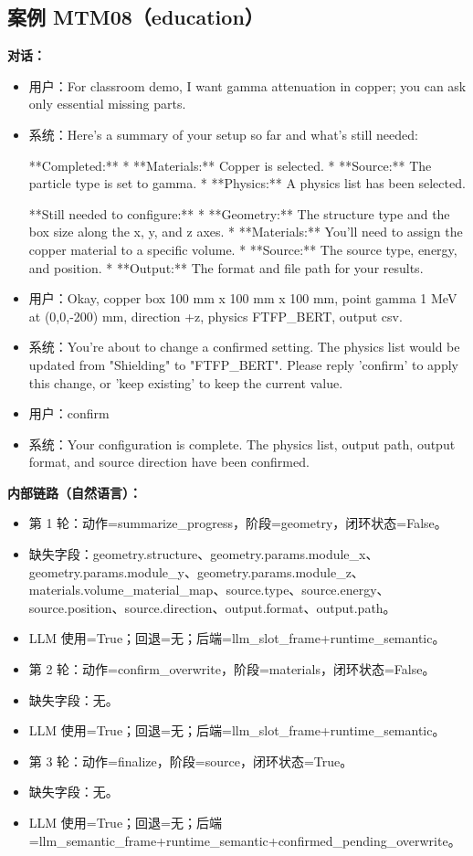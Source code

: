 \documentclass[11pt]{ctexart}
\begin{document}
\subsection{案例 MTM08（education）}
\textbf{对话：}
\begin{itemize}
\item 用户：For classroom demo, I want gamma attenuation in copper; you can ask only essential missing parts.
\item 系统：Here's a summary of your setup so far and what's still needed:

**Completed:**
*   **Materials:** Copper is selected.
*   **Source:** The particle type is set to gamma.
*   **Physics:** A physics list has been selected.

**Still needed to configure:**
*   **Geometry:** The structure type and the box size along the x, y, and z axes.
*   **Materials:** You'll need to assign the copper material to a specific volume.
*   **Source:** The source type, energy, and position.
*   **Output:** The format and file path for your results.
\item 用户：Okay, copper box 100 mm x 100 mm x 100 mm, point gamma 1 MeV at (0,0,-200) mm, direction +z, physics FTFP\_BERT, output csv.
\item 系统：You're about to change a confirmed setting. The physics list would be updated from "Shielding" to "FTFP\_BERT". Please reply 'confirm' to apply this change, or 'keep existing' to keep the current value.
\item 用户：confirm
\item 系统：Your configuration is complete. The physics list, output path, output format, and source direction have been confirmed.
\end{itemize}
\textbf{内部链路（自然语言）：}
\begin{itemize}
\item 第 1 轮：动作=summarize\_progress，阶段=geometry，闭环状态=False。
\item 缺失字段：geometry.structure、geometry.params.module\_x、geometry.params.module\_y、geometry.params.module\_z、materials.volume\_material\_map、source.type、source.energy、source.position、source.direction、output.format、output.path。
\item LLM 使用=True；回退=无；后端=llm\_slot\_frame+runtime\_semantic。
\item 第 2 轮：动作=confirm\_overwrite，阶段=materials，闭环状态=False。
\item 缺失字段：无。
\item LLM 使用=True；回退=无；后端=llm\_slot\_frame+runtime\_semantic。
\item 第 3 轮：动作=finalize，阶段=source，闭环状态=True。
\item 缺失字段：无。
\item LLM 使用=True；回退=无；后端=llm\_semantic\_frame+runtime\_semantic+confirmed\_pending\_overwrite。
\end{itemize}
\end{document}
